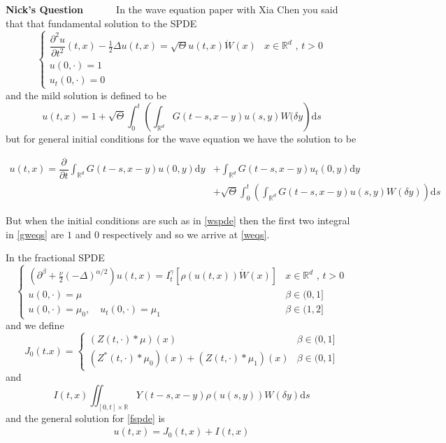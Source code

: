 \documentclass[a4paper,11pt]{article}
\numberwithin{equation}{section}
\theoremstyle{plain}
\theoremstyle{definition}
\newcommand{\ud}{\ensuremath{\mathrm{d} }}
\newcommand{\R}{\mathbb{R}}
\newcounter{NQ}
\newenvironment{NickQuestion}[1][] %
{\refstepcounter{NQ}
	\begin{mdframed}[backgroundcolor=lightgray]\textbf{Nick's Question \theNQ \: #1~~}~~~\noindent}%
	{\end{mdframed}}
\numberwithin{NQ}{section}
\numberwithin{LQ}{section}
\numberwithin{ZQ}{section}
\begin{document}
	\begin{NickQuestion}
		In the wave equation paper with Xia Chen you said that that fundamental solution to the SPDE
		\begin{equation}
		\label{wspde}
		\begin{cases}
		\dfrac{\partial^2 u}{\partial t^2}(t,x)-\frac{1}{2}\Delta u(t,x) = \sqrt{\Theta}u(t,x)\dot W(x) & \text{$x\in \R^d$ , $t>0$} \\
		u(0,\cdot) = 1                                                                                  &                            \\
		u_t(0,\cdot) = 0
		\end{cases}
		\end{equation}
		and the mild solution is defined to be
		\begin{equation} \label{weqs}
		u(t,x) = 1 + \sqrt{\Theta}\int_0^t \left( \int_{\R^d}G(t-s,x-y)u(s,y) W(\delta y \right) \ud s
		\end{equation}
		but for general initial conditions for the wave equation we have the solution to be

		\begin{align}
		\label{gweqs}
		u(t,x) = \dfrac{\partial}{\partial t} \int_{\R^d}G(t-s,x-y)u(0,y) \ud y &+ \int_{\R^d}G(t-s,x-y)u_t(0,y) \ud y \nonumber \\
		& + \sqrt{\Theta}\int_0^t \left( \int_{\R^d}G(t-s,x-y)u(s,y) W(\delta y) \right) \ud s
		\end{align}

		But when the initial conditions are such as in \ref{wspde} then the first two integral in \ref{gweqs} are $1$ and $0$ respectively and so we arrive at \ref{weqs}.

		In the fractional SPDE
		\begin{equation}
		\begin{cases}
		\left(\partial^\beta + \frac{\nu}{2}(-\Delta)^{\alpha/2}\right)u(t,x) = I^\gamma_t \left[\rho(u(t,x))\dot W(x) \right] & \text{$x\in \R^d$ , $t>0$} \\
		u(0,\cdot) = \mu                                                                                                       & \beta \in (0,1]            \\
		u(0,\cdot) = \mu_0, \quad u_t(0,\cdot) = \mu_1                                                                         & \beta \in (1,2]
		\end{cases}  \label{fspde}
		\end{equation}
		and we define
		\[
		J_0(t.x) =
		\begin{cases}
		(Z(t,\cdot)*\mu)(x)                              & \beta \in (0,1] \\
		(Z^*(t,\cdot)*\mu_0)(x) +  (Z(t,\cdot)*\mu_1)(x) & \beta \in (0,1]
		\end{cases}
		\]
		and
		\[
		I(t,x) \iint_{[0,t] \times \R} Y(t-s, x-y) \rho (u(s,y)) W(\delta y) \ud s
		\]
		and the general solution for \ref{fspde} is
		\begin{align}
		u(t,x) = J_0(t,x) + I(t,x) \label{feqs}
		\end{align}


\end{NickQuestion}
\end{document}
